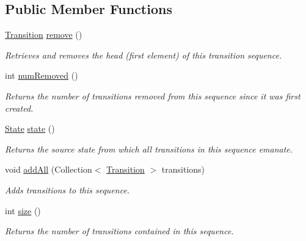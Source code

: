 \subsection*{Public Member Functions}
\begin{DoxyCompactItemize}
\item 
\hyperlink{interfaceedu_1_1udel_1_1cis_1_1vsl_1_1civl_1_1semantics_1_1IF_1_1Transition}{Transition} \hyperlink{interfaceedu_1_1udel_1_1cis_1_1vsl_1_1civl_1_1semantics_1_1IF_1_1TransitionSequence_aa80c2129af658f495265c5748169b267}{remove} ()
\begin{DoxyCompactList}\small\item\em Retrieves and removes the head (first element) of this transition sequence. \end{DoxyCompactList}\item 
int \hyperlink{interfaceedu_1_1udel_1_1cis_1_1vsl_1_1civl_1_1semantics_1_1IF_1_1TransitionSequence_a93325f566f9cca773c950342ae0a0752}{num\+Removed} ()
\begin{DoxyCompactList}\small\item\em Returns the number of transitions removed from this sequence since it was first created. \end{DoxyCompactList}\item 
\hyperlink{interfaceedu_1_1udel_1_1cis_1_1vsl_1_1civl_1_1state_1_1IF_1_1State}{State} \hyperlink{interfaceedu_1_1udel_1_1cis_1_1vsl_1_1civl_1_1semantics_1_1IF_1_1TransitionSequence_a51f0ffaeedfe8afaf3c2a183382a1189}{state} ()
\begin{DoxyCompactList}\small\item\em Returns the source state from which all transitions in this sequence emanate. \end{DoxyCompactList}\item 
void \hyperlink{interfaceedu_1_1udel_1_1cis_1_1vsl_1_1civl_1_1semantics_1_1IF_1_1TransitionSequence_a949abe24a84ed205f6508a9056e9f6c9}{add\+All} (Collection$<$ \hyperlink{interfaceedu_1_1udel_1_1cis_1_1vsl_1_1civl_1_1semantics_1_1IF_1_1Transition}{Transition} $>$ transitions)
\begin{DoxyCompactList}\small\item\em Adds transitions to this sequence. \end{DoxyCompactList}\item 
int \hyperlink{interfaceedu_1_1udel_1_1cis_1_1vsl_1_1civl_1_1semantics_1_1IF_1_1TransitionSequence_a66ec9790e494adf1e966775fc9a208cc}{size} ()
\begin{DoxyCompactList}\small\item\em Returns the number of transitions contained in this sequence. \end{DoxyCompactList}\item 

\end{DoxyCompactItemize}

